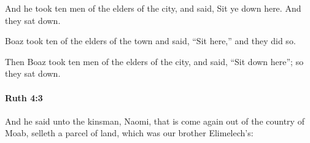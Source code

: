 			\begin{versebox}
					\item[BHS] 
					\item[LXX] 
					\item[ASV] And he took ten men of the elders of the city, and said, Sit ye down here. And they sat down.
					\item[NIV] Boaz took ten of the elders of the town and said, “Sit here,” and they did so.
					\item[NRSV] Then Boaz took ten men of the elders of the city, and said, “Sit down here”; so they sat down.
			\end{versebox}

		\paragraph{Ruth 4:3} %
			\label{RUTH-4-3}

			And he said unto the kinsman, Naomi, that is come again out of the country of Moab, selleth a parcel of land, which was our brother Elimelech’s:

